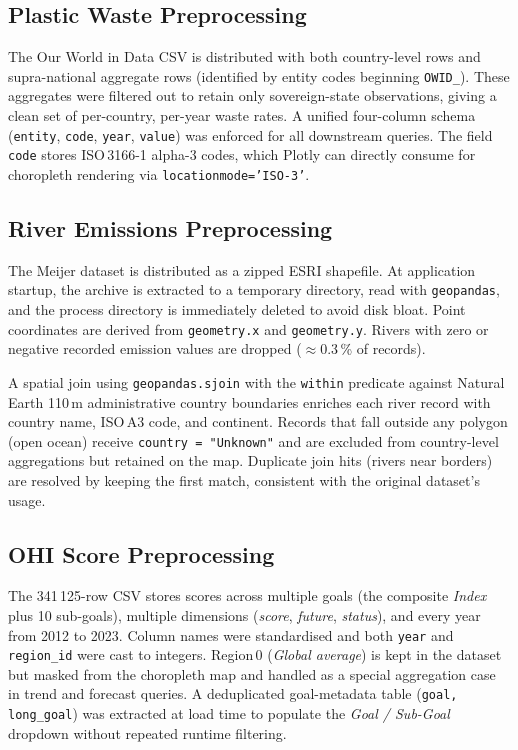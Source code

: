 \documentclass[10pt,twocolumn]{article}
\newcommand{\tool}[1]{\texttt{#1}}
\begin{document}
\subsection{Plastic Waste Preprocessing}

The Our World in Data CSV is distributed with both country-level rows and
supra-national aggregate rows (identified by entity codes beginning
\tool{OWID\_}).
These aggregates were filtered out to retain only sovereign-state
observations, giving a clean set of per-country, per-year waste rates.
A unified four-column schema (\tool{entity}, \tool{code}, \tool{year},
\tool{value}) was enforced for all downstream queries.
The field \tool{code} stores ISO\,3166-1 alpha-3 codes, which Plotly can
directly consume for choropleth rendering via
\tool{locationmode='ISO-3'}.

\subsection{River Emissions Preprocessing}

The Meijer dataset is distributed as a zipped ESRI shapefile.
At application startup, the archive is extracted to a temporary directory,
read with \tool{geopandas}, and the process directory is immediately deleted
to avoid disk bloat.
Point coordinates are derived from \tool{geometry.x} and \tool{geometry.y}.
Rivers with zero or negative recorded emission values are dropped
($\approx$0.3\,\% of records).

A spatial join using \tool{geopandas.sjoin} with the \texttt{within} predicate
against Natural Earth 110\,m administrative country boundaries enriches each
river record with country name, ISO\,A3 code, and continent.
Records that fall outside any polygon (open ocean) receive \texttt{country\,=\,"Unknown"} and are excluded from country-level aggregations but retained on the
map.
Duplicate join hits (rivers near borders) are resolved by keeping the first
match, consistent with the original dataset's usage.

\subsection{OHI Score Preprocessing}

The 341\,125-row CSV stores scores across multiple goals
(the composite \emph{Index} plus 10 sub-goals), multiple dimensions
(\emph{score}, \emph{future}, \emph{status}), and every year from 2012 to
2023.
Column names were standardised and both \tool{year} and \tool{region\_id}
were cast to integers.
Region\,0 (\emph{Global average}) is kept in the dataset but masked from the
choropleth map and handled as a special aggregation case in trend and
forecast queries.
A deduplicated goal-metadata table (\tool{goal, long\_goal}) was extracted
at load time to populate the \emph{Goal / Sub-Goal} dropdown without
repeated runtime filtering.
\end{document}
